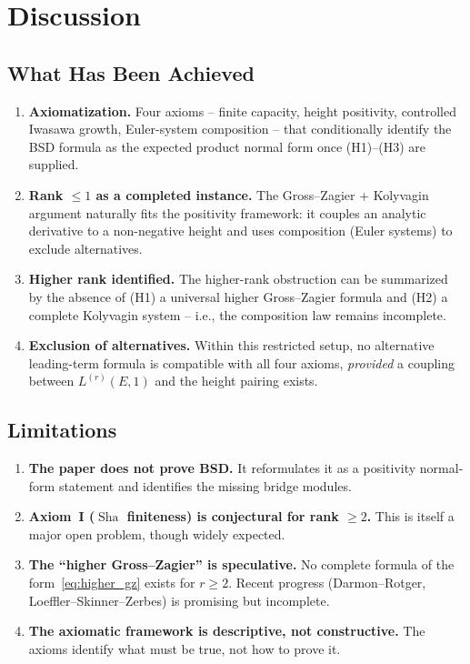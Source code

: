 \documentclass[aps,prd,twocolumn,superscriptaddress,nofootinbib,floatfix]{revtex4-2}
\theoremstyle{definition}
\theoremstyle{remark}
\DeclareMathOperator{\Sha}{Sha}
\begin{document}
\clearpage
\section{Discussion}
\label{sec:discussion}

\subsection{What Has Been Achieved}

\begin{enumerate}
\item \textbf{Axiomatization.} Four axioms -- finite capacity, height positivity, controlled Iwasawa growth, Euler-system composition -- that conditionally identify the BSD formula as the expected product normal form once (H1)--(H3) are supplied.

\item \textbf{Rank $\leq 1$ as a completed instance.} The Gross--Zagier + Kolyvagin argument naturally fits the positivity framework: it couples an analytic derivative to a non-negative height and uses composition (Euler systems) to exclude alternatives.

\item \textbf{Higher rank identified.} The higher-rank obstruction can be summarized by the absence of (H1) a universal higher Gross--Zagier formula and (H2) a complete Kolyvagin system -- i.e., the composition law remains incomplete.

\item \textbf{Exclusion of alternatives.} Within this restricted setup, no alternative leading-term formula is compatible with all four axioms, \textit{provided} a coupling between $L^{(r)}(E,1)$ and the height pairing exists.
\end{enumerate}

\subsection{Limitations}

\begin{enumerate}
\item \textbf{The paper does not prove BSD.} It reformulates it as a positivity normal-form statement and identifies the missing bridge modules.

\item \textbf{Axiom~I ($\Sha$ finiteness) is conjectural for rank $\geq 2$.} This is itself a major open problem, though widely expected.

\item \textbf{The ``higher Gross--Zagier'' is speculative.} No complete formula of the form~\eqref{eq:higher_gz} exists for $r \geq 2$. Recent progress (Darmon--Rotger, Loeffler--Skinner--Zerbes) is promising but incomplete.

\item \textbf{The axiomatic framework is descriptive, not constructive.} The axioms identify what must be true, not how to prove it.
\end{enumerate}
\end{document}
